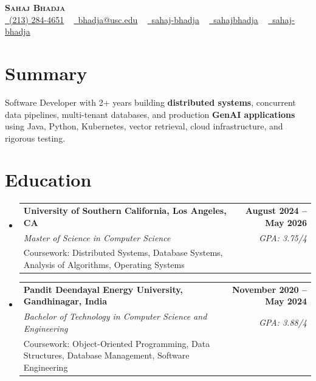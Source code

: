\documentclass[letterpaper,10pt]{article}
\makeatletter
\newcommand{\sectionGap}{\vspace{-8pt}}
\newcommand{\resumeEduSubheading}[5]{\vspace{-1pt}\item\begin{tabular*}{1.0\textwidth}[t]{l@{\extracolsep{\fill}}r}\textbf{#1} & \textbf{\small #2} \\\textit{\small #3} & \textit{\small #4} \\\small #5 & \\\end{tabular*}\vspace{-4pt}}
\newcommand{\resumeSubHeadingListStart}{\begin{itemize}[leftmargin=0.0in, label={}]}
\newcommand{\resumeSubHeadingListEnd}{\end{itemize}}
\makeatother
\begin{document}
\begin{center}
{\Huge \scshape \textbf{Sahaj Bhadja}} \\ \vspace{1pt}
\small \href{tel:2132844651}{\faPhone\ \underline{(213) 284-4651}} ~ \href{mailto:bhadja@usc.edu}{\raisebox{-0.2\height}\faEnvelope\ \underline{bhadja@usc.edu}} ~
\href{https://www.linkedin.com/in/sahaj-bhadja/}{\raisebox{-0.2\height}\faLinkedin\ \underline{sahaj-bhadja}} ~ \href{https://github.com/SAHAJ-BHADJA}{\raisebox{-0.2\height}\faGithub\ \underline{sahajbhadja}} ~
\href{https://sahaj-bhadja.vercel.app/}{\raisebox{-0.2\height}\faGlobe\ \underline{sahaj-bhadja}}
\end{center}
\vspace{-16pt}
\section{Summary}
\begin{itemize}[leftmargin=0.15in, label={}]
\small{\item{Software Developer with 2+ years building \textbf{distributed systems}, concurrent data pipelines, multi-tenant databases, and production \textbf{GenAI applications} using Java, Python, Kubernetes, vector retrieval, cloud infrastructure, and rigorous testing.}}
\end{itemize}
\sectionGap
\section{Education}
\resumeSubHeadingListStart
\resumeEduSubheading{University of Southern California, Los Angeles, CA}{August 2024 -- May 2026}{Master of Science in Computer Science}{GPA: 3.75/4}{Coursework: Distributed Systems, Database Systems, Analysis of Algorithms, Operating Systems}
\resumeEduSubheading{Pandit Deendayal Energy University, Gandhinagar, India}{November 2020 -- May 2024}{Bachelor of Technology in Computer Science and Engineering}{GPA: 3.88/4}{Coursework: Object-Oriented Programming, Data Structures, Database Management, Software Engineering}
\resumeSubHeadingListEnd
\sectionGap
\end{document}
